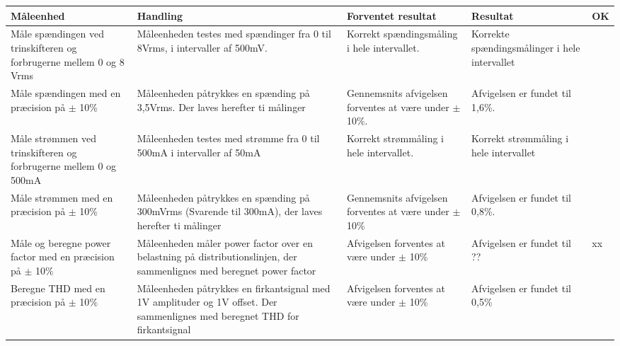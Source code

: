 \begin{longtable}{|p{4cm}|p{3cm}|p{3cm}|p{3cm}|p{1cm}|}
	\hline
	\textbf{Måleenhed} & \textbf{Handling} & \textbf{Forventet resultat} & \textbf{Resultat} &\textbf{OK} \\\hline
	Måle spændingen ved trinskifteren og forbrugerne mellem 0 og 8 Vrms & Måleenheden testes med spændinger fra 0 til 8Vrms, i intervaller af 500mV. & Korrekt spændingsmåling i hele intervallet. & Korrekte spændingsmålinger i hele intervallet & \checkmark\\\hline
	Måle spændingen med en præcision på $\pm$ 10\%& Måleenheden påtrykkes en spænding på 3,5Vrms. Der laves herefter ti målinger& Gennemsnits afvigelsen forventes at være under $\pm$10\%.& Afvigelsen er fundet til 1,6\%. &\checkmark\\\hline
	Måle strømmen ved trinskifteren og forbrugerne mellem 0 og 500mA& Måleenheden testes med strømme fra 0 til 500mA i intervaller af 50mA&Korrekt strømmåling i hele intervallet.&Korrekt strømmåling i hele intervallet&\checkmark\\\hline
	Måle strømmen med en præcision på $\pm$ 10\%&Måleenheden påtrykkes en spænding på 300mVrms (Svarende til 300mA), der laves herefter ti målinger&Gennemsnits afvigelsen forventes at være under $\pm$10\%&Afvigelsen er fundet til 0,8\%.&\checkmark\\\hline
	Måle og beregne power factor med en præcision på $\pm$ 10$\%$&Måleenheden måler power factor over en belastning på distributionslinjen, der sammenlignes med beregnet power factor&Afvigelsen forventes at være under $\pm$ 10\% &Afvigelsen er fundet til ??&xx\\\hline
	Beregne THD med en præcision på $\pm$ 10$\%$&Måleenheden påtrykkes en firkantsignal med 1V amplituder og 1V offset. Der sammenlignes med beregnet THD for firkantsignal& Afvigelsen forventes at være under $\pm$ 10\%&Afvigelsen er fundet til 0,5\%&\checkmark\\\hline
	
\end{longtable}


